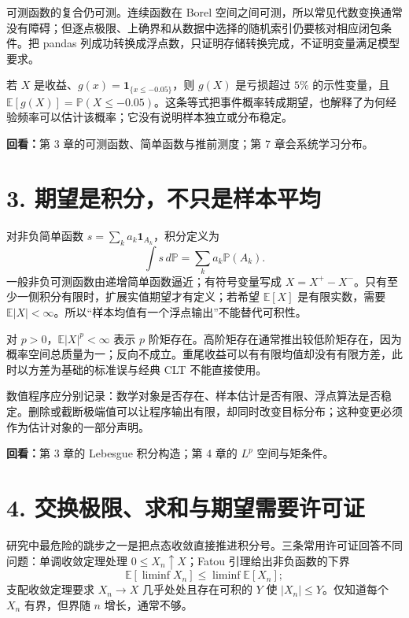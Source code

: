 可测函数的复合仍可测。连续函数在 Borel 空间之间可测，所以常见代数变换通常没有障碍；但逐点极限、上确界和从数据中选择的随机索引仍要核对相应闭包条件。把 pandas 列成功转换成浮点数，只证明存储转换完成，不证明变量满足模型要求。

\begin{example}
若 $X$ 是收益、$g(x)=\mathbf1_{\{x\le-0.05\}}$，则 $g(X)$ 是亏损超过 $5\%$ 的示性变量，且 $\mathbb E[g(X)]=\mathbb P(X\le-0.05)$。这条等式把事件概率转成期望，也解释了为何经验频率可以估计该概率；它没有说明样本独立或分布稳定。
\end{example}

\noindent\textbf{回看：}第 3 章的可测函数、简单函数与推前测度；第 7 章会系统学习分布。

\section*{3. 期望是积分，不只是样本平均}

对非负简单函数 $s=\sum_k a_k\mathbf1_{A_k}$，积分定义为
\[
 \int s\,d\mathbb P=\sum_k a_k\mathbb P(A_k).
\]
一般非负可测函数由递增简单函数逼近；有符号变量写成 $X=X^+-X^-$。只有至少一侧积分有限时，扩展实值期望才有定义；若希望 $\mathbb E[X]$ 是有限实数，需要 $\mathbb E|X|<\infty$。所以“样本均值有一个浮点输出”不能替代可积性。

对 $p>0$，$\mathbb E|X|^p<\infty$ 表示 $p$ 阶矩存在。高阶矩存在通常推出较低阶矩存在，因为概率空间总质量为一；反向不成立。重尾收益可以有有限均值却没有有限方差，此时以方差为基础的标准误与经典 CLT 不能直接使用。

\begin{implementationnote}
数值程序应分别记录：数学对象是否存在、样本估计是否有限、浮点算法是否稳定。删除或截断极端值可以让程序输出有限，却同时改变目标分布；这种变更必须作为估计对象的一部分声明。
\end{implementationnote}

\noindent\textbf{回看：}第 3 章的 Lebesgue 积分构造；第 4 章的 $L^p$ 空间与矩条件。

\section*{4. 交换极限、求和与期望需要许可证}

研究中最危险的跳步之一是把点态收敛直接推进积分号。三条常用许可证回答不同问题：单调收敛定理处理 $0\le X_n\uparrow X$；Fatou 引理给出非负函数的下界
\[
 \mathbb E[\liminf X_n]\le\liminf\mathbb E[X_n];
\]
支配收敛定理要求 $X_n\to X$ 几乎处处且存在可积的 $Y$ 使 $|X_n|\le Y$。仅知道每个 $X_n$ 有界，但界随 $n$ 增长，通常不够。

